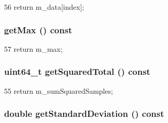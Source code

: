 \begin{DoxyCode}
56 { return m_data[index]; }
\end{DoxyCode}
\hypertarget{classHistogram_a4704b6d6fba1fd2cca0790b79fa19279}{
\subsubsection[{getMax}]{ getMax () const}}
\label{classHistogram_a4704b6d6fba1fd2cca0790b79fa19279}



\begin{DoxyCode}
57 { return m_max; }
\end{DoxyCode}
\hypertarget{classHistogram_aeb3bc1d3b94443057568a6a04511cb4a}{
\subsubsection[{getSquaredTotal}]{\setlength{\rightskip}{0pt plus 5cm}uint64\_\-t getSquaredTotal () const}}
\label{classHistogram_aeb3bc1d3b94443057568a6a04511cb4a}



\begin{DoxyCode}
55 { return m_sumSquaredSamples; }
\end{DoxyCode}
\hypertarget{classHistogram_afe7c01ff325666636e278dc9a2a92ce1}{
\subsubsection[{getStandardDeviation}]{\setlength{\rightskip}{0pt plus 5cm}double getStandardDeviation () const}}
\label{classHistogram_afe7c01ff325666636e278dc9a2a92ce1}




